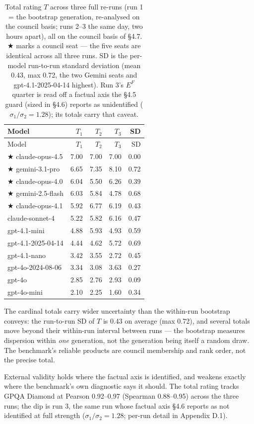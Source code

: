 \begin{longtable}[]{@{}lrrrr@{}}
\caption{Total rating \(T\) across three full re-runs (run 1 = the bootstrap generation, re-analysed on the council basis; runs 2--3 the same day, two hours apart), all on the council basis of §4.7. ★ marks a council seat --- the five seats are identical across all three runs. SD is the per-model run-to-run standard deviation (mean 0.43, max 0.72, the two Gemini seats and gpt-4.1-2025-04-14 highest). Run 3's \(E^{F}\) quarter is read off a factual axis the §4.5 guard (sized in §4.6) reports as unidentified (\(\sigma_1/\sigma_2 = 1.28\)); its totals carry that caveat.}\tabularnewline
\toprule\noalign{}
Model & \(T_1\) & \(T_2\) & \(T_3\) & SD \\
\midrule\noalign{}
\endfirsthead
\toprule\noalign{}
Model & \(T_1\) & \(T_2\) & \(T_3\) & SD \\
\midrule\noalign{}
\endhead
\bottomrule\noalign{}
\endlastfoot
★ claude-opus-4.5 & 7.00 & 7.00 & 7.00 & 0.00 \\
★ gemini-3.1-pro & 6.65 & 7.35 & 8.10 & 0.72 \\
★ claude-opus-4.0 & 6.04 & 5.50 & 6.26 & 0.39 \\
★ gemini-2.5-flash & 6.03 & 5.84 & 4.78 & 0.68 \\
★ claude-opus-4.1 & 5.92 & 6.77 & 6.19 & 0.43 \\
claude-sonnet-4 & 5.22 & 5.82 & 6.16 & 0.47 \\
gpt-4.1-mini & 4.88 & 5.93 & 4.93 & 0.59 \\
gpt-4.1-2025-04-14 & 4.44 & 4.62 & 5.72 & 0.69 \\
gpt-4.1-nano & 3.42 & 3.55 & 2.72 & 0.45 \\
gpt-4o-2024-08-06 & 3.34 & 3.08 & 3.63 & 0.27 \\
gpt-4o & 2.85 & 2.76 & 2.93 & 0.09 \\
gpt-4o-mini & 2.10 & 2.25 & 1.60 & 0.34 \\
\end{longtable}

The cardinal totals carry wider uncertainty than the within-run bootstrap conveys: the run-to-run SD of \(T\) is 0.43 on average (max 0.72), and several totals move beyond their within-run interval between runs --- the bootstrap measures dispersion within \emph{one} generation, not the generation being itself a random draw. The benchmark's reliable products are council membership and rank order, not the precise total.

External validity holds where the factual axis is identified, and weakens exactly where the benchmark's own diagnostic says it should. The total rating tracks GPQA Diamond at Pearson 0.92--0.97 (Spearman 0.88--0.95) across the three runs; the dip is run 3, the same run whose factual axis §4.6 reports as not identified at full strength (\(\sigma_1/\sigma_2 = 1.28\); per-run detail in Appendix D.1).

